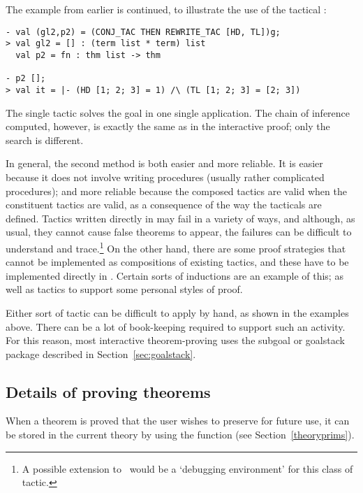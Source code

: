 The example from earlier
is continued, to illustrate the use of the tactical :

\begin{session}\begin{verbatim}
- val (gl2,p2) = (CONJ_TAC THEN REWRITE_TAC [HD, TL])g;
> val gl2 = [] : (term list * term) list
  val p2 = fn : thm list -> thm

- p2 [];
> val it = |- (HD [1; 2; 3] = 1) /\ (TL [1; 2; 3] = [2; 3])
\end{verbatim}\end{session}

\noindent The single tactic 
solves the goal in one single application. The chain of inference computed,
however, is exactly the same as in the interactive proof; only the search is
different.

In general, the second method is both easier and more reliable.  It is
easier because it does not involve writing \ML{} procedures (usually
rather complicated procedures); and more reliable because
the composed tactics are valid
 when the constituent tactics are valid,
as a consequence of the way the tacticals are defined. Tactics written
directly in \ML{} may fail
%
%
%
%
in a variety of ways, and although, as usual, they cannot cause false
theorems to appear, the failures can be difficult to understand and
trace.\footnote{A possible extension to \HOL\ would be a `debugging
  environment' for this class of tactic.} On the other hand, there are
some proof strategies that cannot be implemented as compositions of
existing tactics, and these have to be implemented directly in \ML.
Certain sorts of inductions are an example of this; as well as tactics
to support some personal styles of proof.

Either sort of tactic can be difficult to apply by hand, as shown in
the examples above.  There can be a lot of book-keeping required to
support such an activity.  For this reason, most interactive
theorem-proving uses the subgoal or goalstack package described in
Section~\ref{sec:goalstack}.


\subsection{Details of proving theorems}
\label{using-tactics}

When a theorem is proved that the user wishes to preserve for future use,
it can be stored in the current theory
by using the function  (see Section~\ref{theoryprims}).

